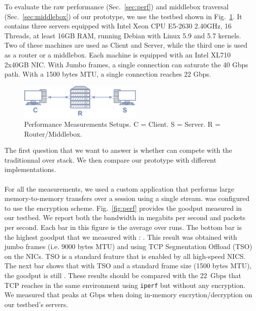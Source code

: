 To evaluate the raw performance (Sec.~\ref{sec:perf}) and middlebox traversal
(Sec.~\ref{sec:middlebox}) of our \tcpls prototype, we use the testbed shown in Fig.~\ref{fig:perf_testbed}. It contains three servers equipped with Intel Xeon CPU E5-2630 2.40GHz, 16 Threads, at least 16GB RAM, running Debian with Linux 5.9 and 5.7 kernels. Two of these machines are used as Client and Server,
while the third one is used as a router or a middlebox. Each machine is equipped with an Intel XL710 2x40GB NIC. With Jumbo frames, a single \tcp connection can saturate the 40 Gbps path. With a 1500 bytes MTU, a single connection reaches 22 Gbps.

\begin{figure}[!t]
  \begin{center}
    \includegraphics[width=6cm]{figures/testbed.png}
  \end{center}
  \vspace{-0.5cm}
  \caption{
    Performance Measurements Setups. C = Client. S = Server. R = Router/Middlebox.}
  \label{fig:perf_testbed}
    \vspace{-0.5cm}
\end{figure}


The first question that we want to answer is whether \tcpls can compete with the traditionnal \tls over \tcp stack. We then compare our \tcpls prototype with different \quic implementations.


\paragraph*{\tcpls}
For all the \tcpls measurements, we used a custom application that performs large memory-to-memory transfers over a \tcpls session using a single stream. \tcpls was configured to use the  encryption scheme.
Fig.~\ref{fig:perf} provides the goodput measured in our testbed. We report both the bandwidth in megabits per second and packets per second.  Each bar in this figure is the average over  runs. The bottom bar is the highest goodput that we measured with \tcpls: . This result was obtained with jumbo frames (i.e. 9000 bytes MTU) and using TCP Segmentation Offload (TSO) on the NICs. TSO is a standard feature that is enabled by all high-speed NICS. The next bar shows that with TSO and a standard frame size (1500 bytes MTU), the goodput is still . These results should be compared with the 22~Gbps that TCP reaches in the same environment using \texttt{iperf} but without any encryption. We measured that  peaks at  Gbps when doing in-memory encrytion/decryption on our testbed's servers.


